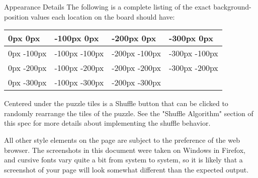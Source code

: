 \documentclass[programming]{../../../../mfcs}
\begin{document}
\begin{question}{Appearance Details}
The following is a complete listing of the exact background-position values each location on the
board should have:
\newline

  \begin{center}
  \begin{tabular}{|l|l|l|l|}
    \hline
  0px 0px  & -100px 0px  & -200px 0px  & -300px 0px
 \\\hline 
  0px -100px & -100px -100px & -200px -100px  & -300px -100px
 \\\hline 

  0px -200px  & -100px -200px &  -200px -200px  & -300px -200px
 \\\hline 

    0px -300px & -100px -300px &  -200px -300px &  
  \\\hline
  \end{tabular}
\end{center}

  \vspace{0.5em}
Centered under the puzzle tiles is a Shuffle button that can be clicked to randomly rearrange the tiles of the puzzle.
See the "Shuffle Algorithm" section of this spec for more details about implementing the shuffle behavior.
\newline

All other style elements on the page are subject to the preference of the web browser. The screenshots in this
document were taken on Windows in Firefox, and cursive fonts vary quite a bit from system to system, so it is
likely that a screenshot of your page will look somewhat different than the expected output.
\end{question}
\end{document}
